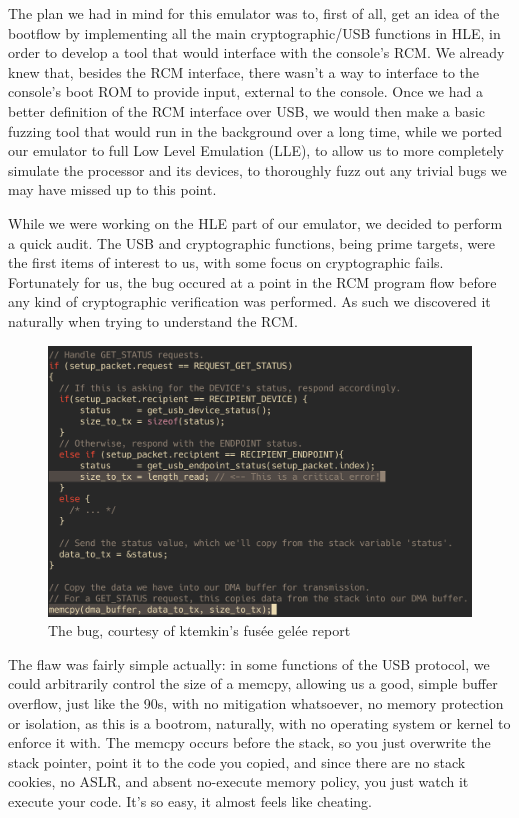 \documentclass[journal]{IEEEtran}
\begin{document}
The plan we had in mind for this emulator was to, first of all, get an idea of the bootflow by
implementing all the main cryptographic/USB functions in HLE, in order to develop a tool that would
interface with the console's RCM. We already knew that, besides the RCM interface, there wasn't a
way to interface to the console's boot ROM to provide input, external to the console. Once we had
a better definition of the RCM interface over USB, we would then make a basic fuzzing tool that
would run in the background over a long time, while we ported our emulator to full Low Level
Emulation (LLE), to allow us to more completely simulate the processor and its devices, to
thoroughly fuzz out any trivial bugs we may have missed up to this point.

While we were working on the HLE part of our emulator, we decided to perform a quick audit.
The USB and cryptographic functions, being prime targets, were the first items of interest to us,
with some focus on cryptographic fails. Fortunately for us, the bug occured at a point in the RCM
program flow before any kind of cryptographic verification was performed. As such we discovered it
naturally when trying to understand the RCM.

\begin{figure}[ht]
  \includegraphics[width=\columnwidth]{bootrom_bug}
    \caption{The bug, courtesy of ktemkin's fusée gelée report \cite{fusee_gelee}}
\end{figure}

The flaw was fairly simple actually: in some functions of the USB protocol, we could arbitrarily
control the size of a memcpy, allowing us a good, simple buffer overflow, just like the 90s, with
no mitigation whatsoever, no memory protection or isolation, as this is a bootrom, naturally, with
no operating system or kernel to enforce it with.
The memcpy occurs before the stack, so you just overwrite the stack pointer, point it to the code
you copied, and since there are no stack cookies, no ASLR, and absent no-execute memory policy,
you just watch it execute your code. It's so easy, it almost feels like cheating.
\end{document}
